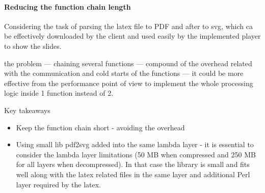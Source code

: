 \paragraph{Reducing the function chain length}

Considering the task of parsing the latex file to PDF and after to svg, which ca be effectively downloaded by the client and used easily by the implemented player to show the slides.

the problem --- chaining several functions --- compound of the overhead related with the communication and cold starts of the functions --- it could be more effective from the performance point of view to implement the whole processing logic inside 1 function instead of 2.

\datasetChainVsSingle


Key takeaways

\begin{itemize}
    \item Keep the function chain short - avoiding the overhead
    \item Using small lib pdf2svg added into the same lambda layer - it is essential to consider the lambda layer limitations (50 MB when compressed and 250 MB for all layers when decompressed). In that case the library is small and fits well along with the latex related files in the same layer and additional Perl layer required by the latex.
\end{itemize}

